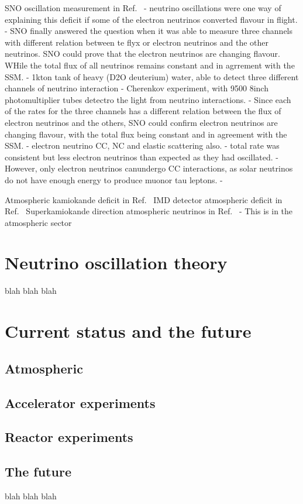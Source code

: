 SNO oscillation measurement in Ref.~\cite{ahmad2002}
- neutrino oscillations were one way of explaining this deficit if some of the electron neutrinos converted flavour in flight.
- SNO finally answered the question when it was able to measure three channels with different relation between te flyx or electron neutrinos and the other neutrinos. SNO could prove that the electron neutrinos are changing flavour. WHile the total flux of all neutrinos remains constant and in agrrement with the SSM.
- 1kton tank of heavy (D2O deuterium) water, able to detect three different channels of neutrino interaction
- Cherenkov experiment, with 9500 8inch photomultiplier tubes detectro the light from neutrino interactions.
- Since each of the rates for the three channels has a different relation between the flux of electron neutrinos and the others, SNO could confirm electron neutrinos are changing flavour, with the total flux being constant and in agreement with the SSM.
- electron neutrino CC, NC and elastic scattering also.
- total rate was consistent but less electron neutrinos than expected as they had oscillated.
- However, only electron neutrinos canundergo CC interactions, as solar neutrinos do not have enough energy to produce muonor tau leptons.
- %

Atmospheric kamiokande deficit in Ref.~\cite{hirata1988}
IMD detector atmospheric deficit in Ref.~\cite{becker1992}
Superkamiokande direction atmospheric neutrinos in Ref.~\cite{becker1992}
- This is in the atmospheric sector

\section{Neutrino oscillation theory}
\label{sec:theorytheory}

blah blah blah

\section{Current status and the future}
\label{sec:theorystatus}

\subsection{Atmospheric}

\subsection{Accelerator experiments}

\subsection{Reactor experiments}

\subsection{The future}


blah blah blah